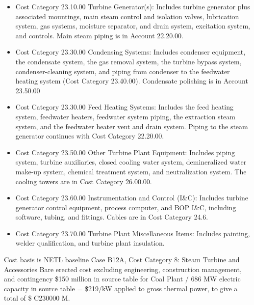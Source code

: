 \begin{itemize}
    \item Cost Category 23.10.00 Turbine Generator(s): Includes turbine generator plus associated mountings, main steam control and isolation valves, lubrication system, gas systems, moisture separator, and drain system, excitation system, and controls. Main steam piping is in Account 22.20.00.
    \item Cost Category 23.30.00 Condensing Systems: Includes condenser equipment, the condensate system, the gas removal system, the turbine bypass system, condenser-cleaning system, and piping from condenser to the feedwater heating system (Cost Category 23.40.00). Condensate polishing is in Account 23.50.00
    \item Cost Category 23.30.00 Feed Heating Systems: Includes the feed heating system, feedwater heaters, feedwater system piping, the extraction steam system, and the feedwater heater vent and drain system. Piping to the steam generator continues with Cost Category 22.20.00.
    \item Cost Category 23.50.00 Other Turbine Plant Equipment: Includes piping system, turbine auxiliaries, closed cooling water system, demineralized water make-up system, chemical treatment system, and neutralization system. The cooling towers are in Cost Category 26.00.00.
    \item Cost Category 23.60.00 Instrumentation and Control (I\&C): Includes turbine generator control equipment, process computer, and BOP I\&C, including software, tubing, and fittings. Cables are in Cost Category 24.6.
    \item Cost Category 23.70.00 Turbine Plant Miscellaneous Items: Includes painting, welder qualification, and turbine plant insulation.
\end{itemize}

Cost basis is NETL baseline Case B12A, Cost Category 8: Steam Turbine and Accessories Bare erected cost excluding engineering, construction management, and contingency \$150 million in source table for Coal Plant / 686 MW electric capacity in source table = \$219/kW applied to gross thermal power, to give a total of \$ C230000 M.
